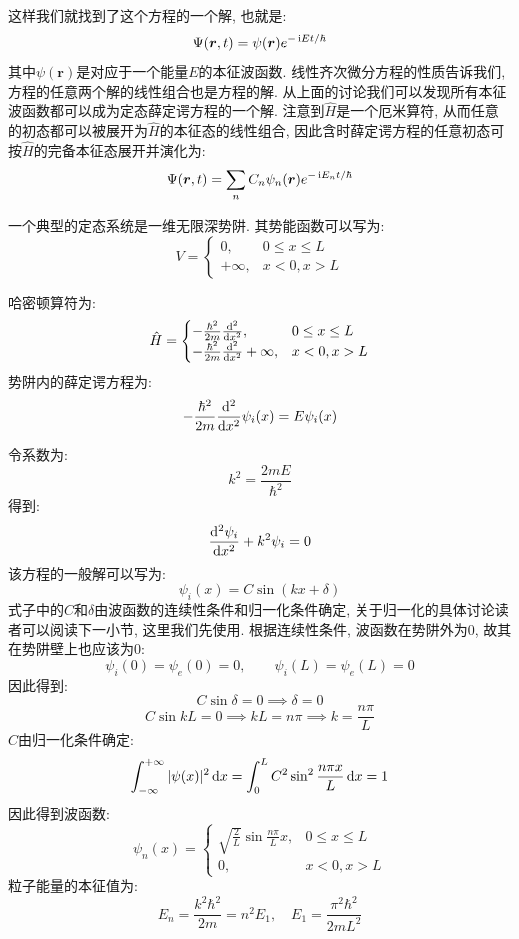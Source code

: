 这样我们就找到了这个方程的一个解, 也就是:
\[
\Psi(\bm{r}, t) = \psi(\bm{r})e^{-\mathop{}\!\mathrm{i} Et/\hbar}
\]
其中$\psi(\bm{r})$是对应于一个能量$E$的本征波函数. 线性齐次微分方程的性质告诉我们, 方程的任意两个解的线性组合也是方程的解. 从上面的讨论我们可以发现所有本征波函数都可以成为定态薛定谔方程的一个解. 注意到$\hat{H}$是一个厄米算符, 从而任意的初态都可以被展开为$\hat{H}$的本征态的线性组合, 因此含时薛定谔方程的任意初态可按$\hat{H}$的完备本征态展开并演化为:
\[
\Psi(\bm{r}, t) = \sum_n C_n \psi_n(\bm{r})e^{-\mathop{}\!\mathrm{i} E_n t/\hbar}
\]

一个典型的定态系统是一维无限深势阱. 其势能函数可以写为:
\[
V = \begin{cases} 0, & 0 \le x \le L \\ +\infty, & x < 0, x > L \end{cases}
\]

哈密顿算符为:
\[
\hat{H} = \begin{cases} -\frac{\hbar^2}{2m} \frac{\mathop{}\!\mathrm{d}^2}{\mathop{}\!\mathrm{d} x^2}, & 0 \le x \le L \\ -\frac{\hbar^2}{2m} \frac{\mathop{}\!\mathrm{d}^2}{\mathop{}\!\mathrm{d} x^2} + \infty, & x < 0, x > L \end{cases}
\]
势阱内的薛定谔方程为:
\[
-\frac{\hbar^2}{2m} \frac{\mathop{}\!\mathrm{d}^2}{\mathop{}\!\mathrm{d} x^2} \psi_i(x) = E \psi_i(x)
\]

令系数为:
\[
k^2 = \frac{2mE}{\hbar^2}
\]
得到:
\[
\frac{\mathop{}\!\mathrm{d}^2 \psi_i}{\mathop{}\!\mathrm{d} x^2} + k^2 \psi_i = 0
\]
该方程的一般解可以写为:
\[
\psi_i(x) = C \sin(kx + \delta)
\]
式子中的$C$和$\delta$由波函数的连续性条件和归一化条件确定, 关于归一化的具体讨论读者可以阅读下一小节, 这里我们先使用. 根据连续性条件, 波函数在势阱外为$0$, 故其在势阱壁上也应该为$0$:
\[
\psi_i(0) = \psi_e(0) = 0, \qquad \psi_i(L) = \psi_e(L) = 0
\]
因此得到:
\[
C \sin \delta = 0 \implies \delta = 0
\]
\[
C \sin kL = 0 \implies kL = n\pi \implies k = \frac{n\pi}{L}
\]
$C$由归一化条件确定:
\[
\int_{-\infty}^{+\infty} |\psi(x)|^2 \mathop{}\!\mathrm{d} x = \int_0^L C^2 \sin^2 \frac{n\pi x}{L} \mathop{}\!\mathrm{d} x = 1
\]
因此得到波函数:
\[
\psi_n(x) = \begin{cases} \sqrt{\frac{2}{L}} \sin \frac{n\pi}{L} x, & 0 \le x \le L \\ 0, & x < 0, x > L \end{cases}
\]
粒子能量的本征值为:
\[
E_n = \frac{k^2 \hbar^2}{2m} = n^2 E_1, \quad E_1 = \frac{\pi^2\hbar^2}{2mL^2}
\]

